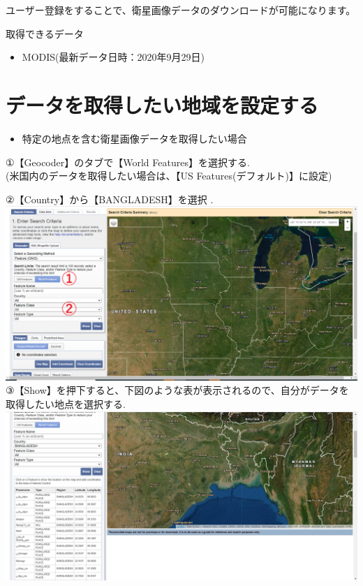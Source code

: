 \documentclass[
]{book}
\providecommand{\tightlist}{%
  \setlength{\itemsep}{0pt}\setlength{\parskip}{0pt}}
\begin{document}
ユーザー登録をすることで、衛星画像データのダウンロードが可能になります。

取得できるデータ

\begin{itemize}
\tightlist
\item
  MODIS(最新データ日時：2020年9月29日)
\end{itemize}

\hypertarget{ux30c7ux30fcux30bfux3092ux53d6ux5f97ux3057ux305fux3044ux5730ux57dfux3092ux8a2dux5b9aux3059ux308b}{%
\section{データを取得したい地域を設定する}\label{ux30c7ux30fcux30bfux3092ux53d6ux5f97ux3057ux305fux3044ux5730ux57dfux3092ux8a2dux5b9aux3059ux308b}}

\begin{itemize}
\tightlist
\item
  特定の地点を含む衛星画像データを取得したい場合
\end{itemize}

①【Geocoder】のタブで【World Features】を選択する.\\
(米国内のデータを取得したい場合は、【US Features(デフォルト)】に設定)

②【Country】から【BANGLADESH】を選択 .\\
\includegraphics{images/area1.png}
③【Show】を押下すると、下図のような表が表示されるので、自分がデータを取得したい地点を選択する.
\includegraphics{images/table1.png}
\end{document}
